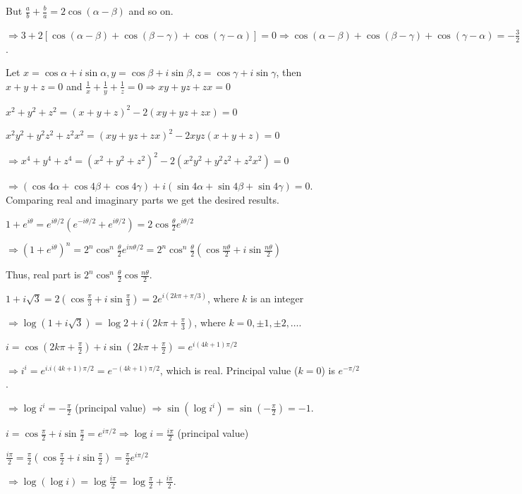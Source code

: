   But $\frac{a}{b} + \frac{b}{a} = 2\cos(\alpha - \beta)$ and so on.

  $\Rightarrow 3 + 2[\cos(\alpha - \beta) + \cos(\beta - \gamma) + \cos(\gamma - \alpha)] = 0 \Rightarrow
  \cos(\alpha - \beta) + \cos(\beta - \gamma) + \cos(\gamma - \alpha) = -\frac{3}{2}$.
\item Let $x = \cos\alpha + i\sin\alpha, y = \cos\beta + i\sin\beta, z = \cos\gamma + i\sin\gamma$, then $x +
  y + z = 0$ and $\frac{1}{x} + \frac{1}{y} + \frac{1}{z} = 0 \Rightarrow xy + yz + zx = 0$

  $x^2 + y^2 + z^2 = (x + y + z)^2 - 2(xy + yz + zx) = 0$

  $x^2y^2 + y^2z^2 + z^2x^2 = (xy + yz + zx)^2 - 2xyz(x + y + z) = 0$

  $\Rightarrow x^4 + y^4 + z^4 = \left(x^2 + y^2 + z^2\right)^2 - 2\left(x^2y^2 + y^2z^2 + z^2x^2\right) =
  0$

  $\Rightarrow (\cos4\alpha + \cos4\beta + \cos4\gamma) + i(\sin4\alpha + \sin4\beta + \sin4\gamma) = 0$.
  Comparing real and imaginary parts we get the desired results.
\item $1 + e^{i\theta} = e^{i\theta/2}\left(e^{-i\theta/2} + e^{i\theta/2}\right) =
  2\cos\frac{\theta}{2}e^{i\theta/2}$

  $\Rightarrow \left(1 + e^{i\theta}\right)^n = 2^n\cos^n\frac{\theta}{2}e^{in\theta/2} =
  2^n\cos^n\frac{\theta}{2}\left(\cos\frac{n\theta}{2} + i\sin\frac{n\theta}{2}\right)$

  Thus, real part is $2^n\cos^n\frac{\theta}{2}\cos\frac{n\theta}{2}$.
\item $1 + i\sqrt{3} = 2\left(\cos\frac{\pi}{3} + i\sin\frac{\pi}{3}\right) = 2e^{i(2k\pi + \pi/3)}$, where
  $k$ is an integer

  $\Rightarrow \log(1 + i\sqrt{3}) = \log2 + i\left(2k\pi + \frac{\pi}{3}\right)$, where $k = 0, \pm1, \pm2,
  \ldots$.
\item $i = \cos\left(2k\pi + \frac{\pi}{2}\right) + i\sin\left(2k\pi + \frac{\pi}{2}\right) = e^{i(4k +
    1)\pi/2}$

  $\Rightarrow i^i = e^{i.i(4k + 1)\pi/2} = e^{-(4k + 1)\pi/2}$, which is real. Principal value ($k = 0$) is
  $e^{-\pi/2}$.

  $\Rightarrow \log i^i = -\frac{\pi}{2}$ (principal value) $\Rightarrow \sin\left(\log i^i\right) =
  \sin\left(-\frac{\pi}{2}\right) = -1$.
\item $i = \cos\frac{\pi}{2} + i\sin\frac{\pi}{2} = e^{i\pi/2} \Rightarrow \log i = \frac{i\pi}{2}$
  (principal value)

  $\frac{i\pi}{2} = \frac{\pi}{2}\left(\cos\frac{\pi}{2} + i\sin\frac{\pi}{2}\right) =
  \frac{\pi}{2}e^{i\pi/2}$

  $\Rightarrow \log(\log i) = \log\frac{i\pi}{2} = \log\frac{\pi}{2} + \frac{i\pi}{2}$.
\stopitemize
